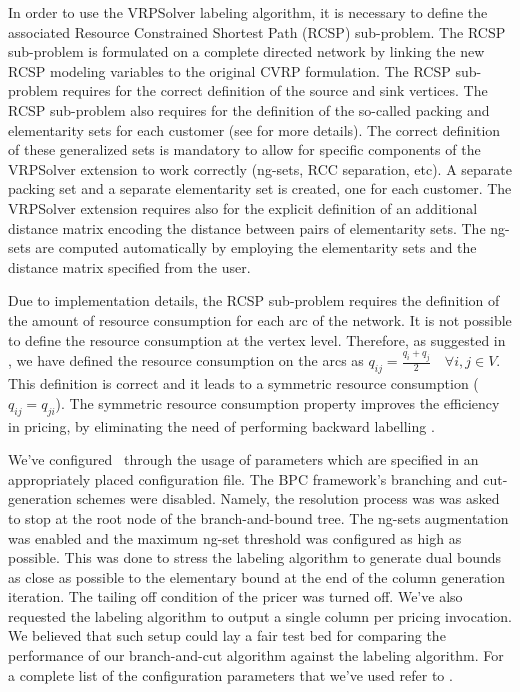 In order to use the VRPSolver labeling algorithm, it is necessary
to define the associated Resource Constrained Shortest Path (RCSP) sub-problem.
The RCSP sub-problem is formulated on a complete directed network by
linking the new RCSP modeling variables to the original CVRP formulation.
The RCSP sub-problem requires for the correct definition of the source and sink
vertices.
The RCSP sub-problem also requires for the definition of the so-called packing and elementarity
sets for each customer (see \cite{pessoa2020a} for more details).
The correct definition of these generalized sets is mandatory to allow for specific
components of the VRPSolver extension to work correctly (ng-sets, RCC separation, etc).
A separate packing set and a separate elementarity set is created, one for each customer.
The VRPSolver extension requires also for the explicit definition of an additional
distance matrix encoding the distance between pairs of elementarity sets.
The ng-sets are computed automatically by employing the elementarity sets
and the distance matrix specified from the user.

Due to implementation details, the RCSP sub-problem requires
the definition of the amount of resource consumption for each arc of the network.
It is not possible to define the resource consumption at the vertex level.
Therefore, as suggested in \textcite{pessoa2020a}, we have defined the resource consumption
on the arcs as $q_{ij} = \frac{q_{i} + q_{j}}{2} \quad \forall i, j \in V$.
This definition is correct and it leads to a symmetric resource consumption ($q_{ij} = q_{ji}$).
The symmetric resource consumption property improves the efficiency in pricing,
by eliminating the need of performing backward labelling \parencite{pessoa2020a}.

\medskip

We've configured \bapcod\ through the usage of parameters which are specified
in an appropriately placed configuration file.
The BPC framework's branching and cut-generation schemes were disabled.
Namely, the resolution process was was asked to stop at
the root node of the branch-and-bound tree.
The ng-sets augmentation was enabled and the maximum ng-set threshold was configured
as high as possible. This was done to stress the labeling algorithm to generate dual bounds as close
as possible to the elementary bound at the end of the column generation iteration.
The tailing off condition of the pricer was turned off.
We've also requested the labeling algorithm to output a single column per pricing invocation.
We believed that such setup could lay a fair test bed
for comparing the performance of our branch-and-cut algorithm against
the labeling algorithm.
For a complete list of the configuration parameters
that  we've used refer to .

